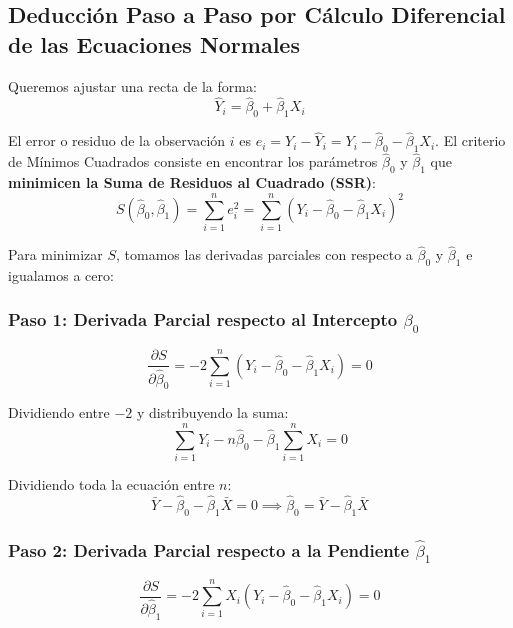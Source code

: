 \documentclass[12pt,letterpaper]{article}
\begin{document}
\subsection{Deducción Paso a Paso por Cálculo Diferencial de las Ecuaciones Normales}
Queremos ajustar una recta de la forma:
\begin{equation}
	\widehat{Y}_i = \hat{\beta}_0 + \hat{\beta}_1 X_i
\end{equation}

El error o residuo de la observación $i$ es $e_i = Y_i - \widehat{Y}_i = Y_i - \hat{\beta}_0 - \hat{\beta}_1 X_i$. El criterio de Mínimos Cuadrados consiste en encontrar los parámetros $\hat{\beta}_0$ y $\hat{\beta}_1$ que \textbf{minimicen la Suma de Residuos al Cuadrado (SSR)}:
\begin{equation}
	S(\hat{\beta}_0, \hat{\beta}_1) = \sum_{i=1}^{n} e_i^2 = \sum_{i=1}^{n} \left( Y_i - \hat{\beta}_0 - \hat{\beta}_1 X_i \right)^2
\end{equation}

Para minimizar $S$, tomamos las derivadas parciales con respecto a $\hat{\beta}_0$ y $\hat{\beta}_1$ e igualamos a cero:

\subsubsection{Paso 1: Derivada Parcial respecto al Intercepto \texorpdfstring{$\hat{\beta}_0$}{beta 0}}
\begin{equation}
	\frac{\partial S}{\partial \hat{\beta}_0} = -2 \sum_{i=1}^{n} \left( Y_i - \hat{\beta}_0 - \hat{\beta}_1 X_i \right) = 0
\end{equation}

Dividiendo entre $-2$ y distribuyendo la suma:
\begin{equation}
	\sum_{i=1}^{n} Y_i - n\hat{\beta}_0 - \hat{\beta}_1 \sum_{i=1}^{n} X_i = 0
\end{equation}

Dividiendo toda la ecuación entre $n$:
\begin{equation}
	\bar{Y} - \hat{\beta}_0 - \hat{\beta}_1 \bar{X} = 0 \implies \hat{\beta}_0 = \bar{Y} - \hat{\beta}_1 \bar{X}
\end{equation}

\subsubsection{Paso 2: Derivada Parcial respecto a la Pendiente \texorpdfstring{$\hat{\beta}_1$}{beta 1}}
\begin{equation}
	\frac{\partial S}{\partial \hat{\beta}_1} = -2 \sum_{i=1}^{n} X_i \left( Y_i - \hat{\beta}_0 - \hat{\beta}_1 X_i \right) = 0
\end{equation}
\end{document}
